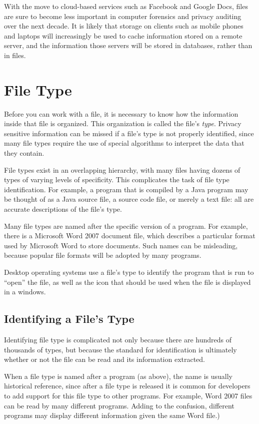 With the move to cloud-based services such as Facebook and Google
Docs, files are sure to become less important in computer forensics
and privacy auditing over the next decade. It is likely that storage
on clients such as mobile phones and laptops will increasingly be used
to cache information stored on a remote server, and the information
those servers will be stored in databases, rather than in files.

\section{File Type}

Before you can work with a file, it is necessary to know how the
information inside that file is organized. This organization is called
the file's \emph{type}. Privacy sensitive information can be missed if
a file's type is not properly identified, since many file types
require the use of special algorithms to interpret the data that they
contain. 

File types exist in an overlapping hierarchy, with many files having
dozens of types of varying levels of specificity. This complicates the
task of file type identification. For example, a program that is
compiled by a Java program may be thought of as a Java source file, a
source code file, or merely a text file: all are accurate descriptions
of the file's type.

Many file types are named after the specific version of a program. For
example, there is a Microsoft Word 2007 document file, which 
describes a particular format used by Microsoft Word to store
documents. Such names can be misleading, because popular file formats will
be adopted by many programs.

Desktop operating systems use a file's type to identify the program
that is run to ``open'' the file, as well as the icon that should be
used when the file is displayed in a windows.

\subsection{Identifying a File's Type}

Identifying file type is complicated not only because there are
hundreds of thousands of types, but because the standard for
identification is ultimately whether or not the file can be read and
its information extracted. 

When a file type is named after a program (as above), the name is
usually historical reference, since after a file type is released it
is common for developers to add support for this file type to other
programs. For example, Word 2007 files can be read by many different
programs. Adding to the confusion, different programs may display
different information given the same Word file.)

